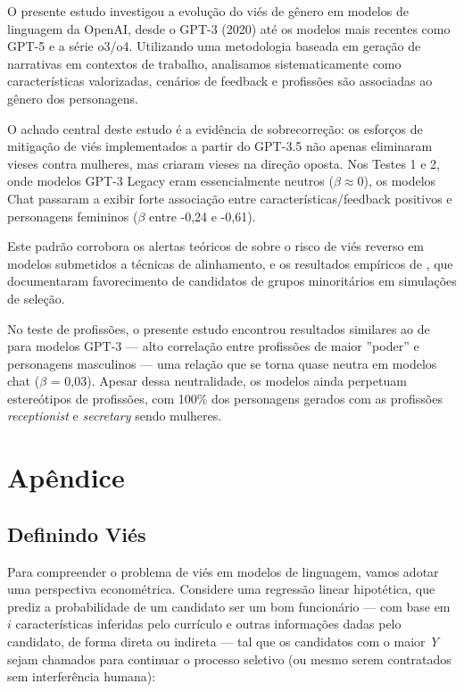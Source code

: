 \documentclass[12pt,a4paper]{article}
\begin{document}
O presente estudo investigou a evolução do viés de gênero em modelos de
linguagem da OpenAI, desde o GPT-3 (2020) até os modelos mais recentes
como GPT-5 e a série o3/o4. Utilizando uma metodologia baseada em
geração de narrativas em contextos de trabalho, analisamos
sistematicamente como características valorizadas, cenários de feedback
e profissões são associadas ao gênero dos personagens.

O achado central deste estudo é a evidência de sobrecorreção: os
esforços de mitigação de viés implementados a partir do GPT-3.5 não
apenas eliminaram vieses contra mulheres, mas criaram vieses na direção
oposta. Nos Testes 1 e 2, onde modelos GPT-3 Legacy eram essencialmente
neutros ($\beta \approx 0$), os modelos Chat passaram a exibir forte associação
entre características/feedback positivos e personagens femininos ($\beta$
entre -0,24 e -0,61).

Este padrão corrobora os alertas teóricos de \citet{liu2025} sobre o
risco de viés reverso em modelos submetidos a técnicas de alinhamento, e
os resultados empíricos de \citet{karvonen2025}, que documentaram
favorecimento de candidatos de grupos minoritários em simulações de
seleção.

No teste de profissões, o presente estudo encontrou resultados similares
ao de \citet{lucy2021} para modelos GPT-3 --- alto correlação entre
profissões de maior ''poder'' e personagens masculinos --- uma relação que
se torna quase neutra em modelos chat ($\beta$ = 0,03). Apesar dessa
neutralidade, os modelos ainda perpetuam estereótipos de profissões, com
100\% dos personagens gerados com as profissões \textit{receptionist} e
\textit{secretary} sendo mulheres.


\section{Apêndice}



\subsection{Definindo Viés}




Para compreender o problema de viés em modelos de linguagem, vamos
adotar uma perspectiva econométrica. Considere uma regressão linear
hipotética, que prediz a probabilidade de um candidato ser um bom
funcionário --- com base em $i$ características inferidas pelo currículo
e outras informações dadas pelo candidato, de forma direta ou indireta
--- tal que os candidatos com o maior \textit{Y} sejam chamados para continuar
o processo seletivo (ou mesmo serem contratados sem interferência
humana):
\end{document}
